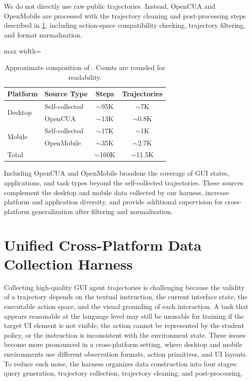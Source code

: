 We do not directly use raw public trajectories. Instead, OpenCUA and
OpenMobile are processed with the trajectory cleaning and post-processing
steps described in \cref{app:data_collection_harness}, including
action-space compatibility checking, trajectory filtering, and format
normalization.

\begin{table}[h]
\centering
\caption{Approximate composition of \BENCH. Counts are rounded for readability.}
\label{tab:dataset_composition}
\normalsize
\begin{adjustbox}{max width=\linewidth}
\begin{tabular}{llcc}
\toprule
\textbf{Platform} & \textbf{Source Type} & \textbf{Steps} & \textbf{Trajectories} \\
\midrule
\multirow{2}{*}{Desktop} & Self-collected & $\sim$95K & $\sim$7K \\
 & OpenCUA & $\sim$13K & $\sim$0.8K \\
\multirow{2}{*}{Mobile} & Self-collected & $\sim$17K & $\sim$1K \\
 & OpenMobile & $\sim$35K & $\sim$2.7K \\
\midrule
\multicolumn{2}{l}{Total} & $\sim$160K & $\sim$11.5K \\
\bottomrule
\end{tabular}
\end{adjustbox}
\end{table}

Including OpenCUA and OpenMobile broadens the coverage of GUI states,
applications, and task types beyond the self-collected trajectories. These
sources complement the desktop and mobile data collected by our harness,
increase platform and application diversity, and provide additional
supervision for cross-platform generalization after filtering and
normalization.

\section{Unified Cross-Platform Data Collection Harness}
\label{app:data_collection_harness}

Collecting high-quality GUI agent trajectories is challenging because the
validity of a trajectory depends on the textual instruction, the current
interface state, the executable action space, and the visual grounding of each
interaction. A task that appears reasonable at the language level may still be
unusable for training if the target UI element is not visible, the action
cannot be represented by the student policy, or the instruction is
inconsistent with the environment state. These issues become more pronounced
in a cross-platform setting, where desktop and mobile environments use
different observation formats, action primitives, and UI layouts. To reduce
such noise, the harness organizes data construction into four stages: query generation, 
trajectory collection, trajectory
cleaning, and post-processing.


